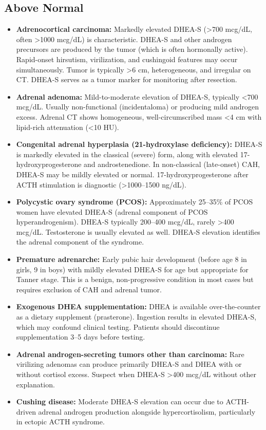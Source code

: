 \subsection*{Above Normal}
\begin{itemize}
  \item \textbf{Adrenocortical carcinoma:} Markedly elevated DHEA-S (>700 mcg/dL, often >1000 mcg/dL) is characteristic. DHEA-S and other androgen precursors are produced by the tumor (which is often hormonally active). Rapid-onset hirsutism, virilization, and cushingoid features may occur simultaneously. Tumor is typically >6 cm, heterogeneous, and irregular on CT. DHEA-S serves as a tumor marker for monitoring after resection.
  \item \textbf{Adrenal adenoma:} Mild-to-moderate elevation of DHEA-S, typically <700 mcg/dL. Usually non-functional (incidentaloma) or producing mild androgen excess. Adrenal CT shows homogeneous, well-circumscribed mass <4 cm with lipid-rich attenuation (<10 HU).
  \item \textbf{Congenital adrenal hyperplasia (21-hydroxylase deficiency):} DHEA-S is markedly elevated in the classical (severe) form, along with elevated 17-hydroxyprogesterone and androstenedione. In non-classical (late-onset) CAH, DHEA-S may be mildly elevated or normal. 17-hydroxyprogesterone after ACTH stimulation is diagnostic (>1000--1500 ng/dL).
  \item \textbf{Polycystic ovary syndrome (PCOS):} Approximately 25--35\% of PCOS women have elevated DHEA-S (adrenal component of PCOS hyperandrogenism). DHEA-S typically 200--400 mcg/dL, rarely >400 mcg/dL. Testosterone is usually elevated as well. DHEA-S elevation identifies the adrenal component of the syndrome.
  \item \textbf{Premature adrenarche:} Early pubic hair development (before age 8 in girls, 9 in boys) with mildly elevated DHEA-S for age but appropriate for Tanner stage. This is a benign, non-progressive condition in most cases but requires exclusion of CAH and adrenal tumor.
  \item \textbf{Exogenous DHEA supplementation:} DHEA is available over-the-counter as a dietary supplement (prasterone). Ingestion results in elevated DHEA-S, which may confound clinical testing. Patients should discontinue supplementation 3--5 days before testing.
  \item \textbf{Adrenal androgen-secreting tumors other than carcinoma:} Rare virilizing adenomas can produce primarily DHEA-S and DHEA with or without cortisol excess. Suspect when DHEA-S >400 mcg/dL without other explanation.
  \item \textbf{Cushing disease:} Moderate DHEA-S elevation can occur due to ACTH-driven adrenal androgen production alongside hypercortisolism, particularly in ectopic ACTH syndrome.
\end{itemize}

